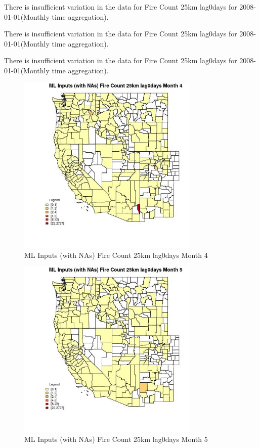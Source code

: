 There is insufficient variation in the data for Fire Count 25km lag0days for 2008-01-01(Monthly time aggregation). 
 

There is insufficient variation in the data for Fire Count 25km lag0days for 2008-01-01(Monthly time aggregation). 
 

There is insufficient variation in the data for Fire Count 25km lag0days for 2008-01-01(Monthly time aggregation). 
 

\begin{figure} 
\centering  
\includegraphics[width=0.77\textwidth]{Code_Outputs/Report_ML_input_PM25_Step4_part_f_de_duplicated_aveswNAs_CountyFire_Count_25km_lag0daysmedianMonth4.jpg} 
\caption{\label{fig:Report_ML_input_PM25_Step4_part_f_de_duplicated_aveswNAsCountyFire_Count_25km_lag0daysmedianMonth4}ML Inputs (with NAs) Fire Count 25km lag0days Month 4} 
\end{figure} 
 

\begin{figure} 
\centering  
\includegraphics[width=0.77\textwidth]{Code_Outputs/Report_ML_input_PM25_Step4_part_f_de_duplicated_aveswNAs_CountyFire_Count_25km_lag0daysmedianMonth5.jpg} 
\caption{\label{fig:Report_ML_input_PM25_Step4_part_f_de_duplicated_aveswNAsCountyFire_Count_25km_lag0daysmedianMonth5}ML Inputs (with NAs) Fire Count 25km lag0days Month 5} 
\end{figure} 
 

